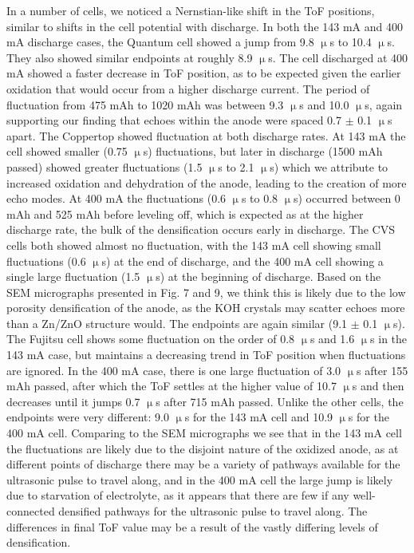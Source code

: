 In a number of cells, we noticed a Nernstian-like shift in the ToF positions, similar to shifts in the cell potential with discharge. In both the 143 mA and 400 mA discharge cases, the Quantum cell showed a jump from 9.8 $\upmu$s to 10.4 $\upmu$s. They also showed similar endpoints at roughly 8.9 $\upmu$s. The cell discharged at 400 mA showed a faster decrease in ToF position, as to be expected given the earlier oxidation that would occur from a higher discharge current. The period of fluctuation from 475 mAh to 1020 mAh was between 9.3 $\upmu$s and 10.0 $\upmu$s, again supporting our finding that echoes within the anode were spaced 0.7 $\pm$ 0.1 $\upmu$s apart. The Coppertop showed fluctuation at both discharge rates. At 143 mA the cell showed smaller (0.75 $\upmu$s) fluctuations, but later in discharge (1500 mAh passed) showed greater fluctuations (1.5 $\upmu$s to 2.1 $\upmu$s) which we attribute to increased oxidation and dehydration of the anode, leading to the creation of more echo modes. At 400 mA the fluctuations (0.6 $\upmu$s to 0.8 $\upmu$s) occurred between 0 mAh and 525 mAh before leveling off, which is expected as at the higher discharge rate, the bulk of the densification occurs early in discharge. The CVS cells both showed almost no fluctuation, with the 143 mA cell showing small fluctuations (0.6 $\upmu$s) at the end of discharge, and the 400 mA cell showing a single large fluctuation (1.5 $\upmu$s) at the beginning of discharge. Based on the SEM micrographs presented in Fig. 7 and 9, we think this is likely due to the low porosity densification of the anode, as the KOH crystals may scatter echoes more than a Zn/ZnO structure would. The endpoints are again similar (9.1 $\pm$ 0.1 $\upmu$s). The Fujitsu cell shows some fluctuation on the order of 0.8 $\upmu$s and 1.6 $\upmu$s in the 143 mA case, but maintains a decreasing trend in ToF position when fluctuations are ignored. In the 400 mA case, there is one large fluctuation of 3.0 $\upmu$s after 155 mAh passed, after which the ToF settles at the higher value of 10.7 $\upmu$s and then decreases until it jumps 0.7 $\upmu$s after 715 mAh passed. Unlike the other cells, the endpoints were very different: 9.0 $\upmu$s for the 143 mA cell and 10.9 $\upmu$s for the 400 mA cell. Comparing to the SEM micrographs we see that in the 143 mA cell the fluctuations are likely due to the disjoint nature of the oxidized anode, as at different points of discharge there may be a variety of pathways available for the ultrasonic pulse to travel along, and in the 400 mA cell the large jump is likely due to starvation of electrolyte, as it appears that there are few if any well-connected densified pathways for the ultrasonic pulse to travel along. The differences in final ToF value may be a result of the vastly differing levels of densification.

